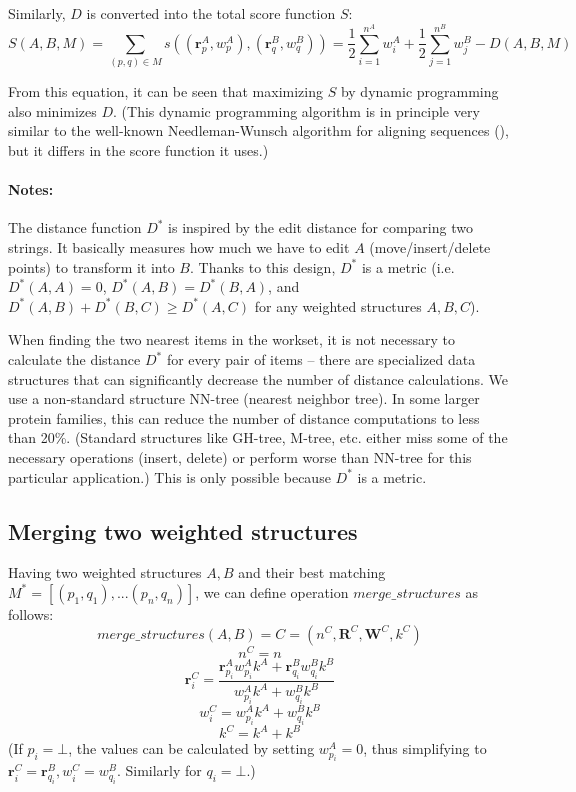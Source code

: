 \documentclass{article}
\begin{document}
Similarly, \(D\) is converted into the total score function \(S\):
  \[
    S(A, B, M) 
    = \sum\limits_{(p, q) \in M}{s \left( (\mathbf{r}^A_{p}, w^A_{p}), (\mathbf{r}^B_{q}, w^B_{q}) \right)}
    = \frac{1}{2} \sum\limits_{i=1}^{n^A}{w^A_i} + \frac{1}{2} \sum\limits_{j=1}^{n^B}{w^B_j} - D(A, B, M)
  \]

From this equation, it can be seen that maximizing \(S\) by dynamic
programming also minimizes \(D\). (This dynamic programming algorithm is in principle
very similar to the well-known Needleman-Wunsch algorithm for aligning sequences 
(), 
but it differs in the score function it uses.)

\paragraph{Notes:} 
The distance function \(D^*\) is inspired by the edit distance for 
comparing two strings. It basically measures how much we have to edit \(A\) 
(move/insert/delete points) to transform it into \(B\). 
Thanks to this design, \(D^*\) is a metric 
(i.e.~\(D^*(A,A) = 0\), \(D^*(A,B) = D^*(B,A)\), and
\(D^*(A,B) + D^*(B,C) \geq D^*(A,C)\) for any weighted structures
\(A, B, C\)).

When finding the two nearest items in the workset, it is not
necessary to calculate the distance \(D^*\) for every pair of items --
there are specialized data structures that can significantly decrease
the number of distance calculations. We use a non-standard structure
NN-tree (nearest neighbor tree). In some larger protein families, this
can reduce the number of distance computations to less than 20\%. 
(Standard structures like GH-tree, M-tree, etc. either miss some of
the necessary operations (insert, delete) or perform worse than NN-tree
for this particular application.) This is only possible because \(D^*\) 
is a metric.




\subsection{Merging two weighted structures}
\label{sec:appendix_ws_merging}

Having two weighted structures \(A, B\) and their best matching
\(M^* = [(p_1, q_1), ... (p_n, q_n)]\), we can define 
operation \(merge\_structures\) as follows:
  \[  merge\_structures(A, B) = C = (n^C, \mathbf{R}^C, \mathbf{W}^C, k^C)  \]
  \[  n^C = n  \]
  \[  \mathbf{r}^C_i = \frac {\mathbf{r}^A_{p_i} w^A_{p_i} k^A + \mathbf{r}^B_{q_i} w^B_{q_i} k^B} {w^A_{p_i} k^A + w^B_{q_i} k^B}  \]
  \[  w^C_i = w^A_{p_i} k^A + w^B_{q_i} k^B  \]
  \[  k^C = k^A + k^B  \]
(If \(p_i=\bot\), the values can be calculated by setting
\(w^A_{p_i} = 0\), thus simplifying to
\(\mathbf{r}^C_i = \mathbf{r}^B_{q_i}, w^C_i = w^B_{q_i}\). Similarly for \(q_i=\bot\).)
\end{document}
